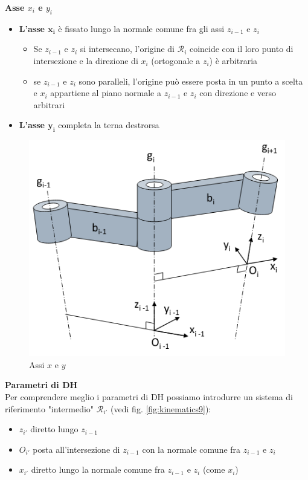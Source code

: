  \textbf{Asse $x_i$ e $y_i$}
\begin{itemize}
	\item \textbf{L’asse $\boldsymbol{x_i}$} è fissato lungo la normale comune fra gli assi $z_{i-1}$ e $z_i$
	\begin{itemize}
		\item Se $z_{i-1}$ e $z_i$ si intersecano, l’origine di $\mathcal{R}_i$ coincide con il loro punto di intersezione e la direzione di $x_i$ (ortogonale a $z_i$) è arbitraria
		\item se $z_{i-1}$ e $z_i$ sono paralleli, l’origine può essere posta in un punto a scelta e $x_i$ appartiene al piano normale a $z_{i-1}$ e $z_i$ con direzione e verso arbitrari 
	\end{itemize}
	\item \textbf{L’asse $\boldsymbol{y_i}$} completa la terna destrorsa
\end{itemize}


\begin{figure}[H]
	\centering
	\includegraphics[width=0.4\linewidth]{images/kinematics_7}
	\caption{Assi $x$ e $y$}
	\label{fig:kinematics7}
\end{figure}



 \textbf{Parametri di DH}\\
Per comprendere meglio i parametri di DH possiamo introdurre un sistema di riferimento "intermedio" $\mathcal{R}_{i'}$ (vedi fig. \ref{fig:kinematics9}):
\begin{itemize}
	\item $z_{i'}$ diretto lungo $z_{i-1}$
	\item $O_{i'}$ posta all’intersezione di $z_{i-1}$ con la normale comune fra $z_{i-1}$ e $z_i$
	\item $x_{i'}$ diretto lungo la normale comune fra	$z_{i-1}$ e $z_i$ (come $x_i$)
\end{itemize}

